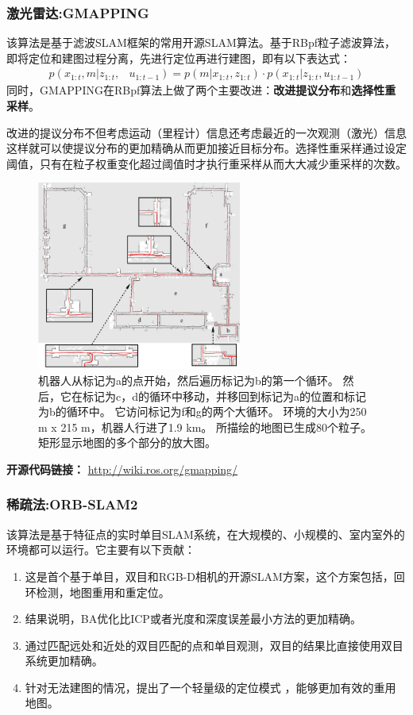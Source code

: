 \documentclass[cs4size,a4paper]{ctexart}
\numberwithin{equation}{section}
\numberwithin{table}{section}
\numberwithin{figure}{section}
\begin{document}
\subsubsection{激光雷达:GMAPPING}
该算法\cite{1570477}是基于滤波SLAM框架的常用开源SLAM算法。基于RBpf粒子滤波算法，即将定位和建图过程分离，先进行定位再进行建图，即有以下表达式：
\begin{align}
    p\left(x_{1: t}, m | z_{1: t},\right.&\left.u_{1: t-1}\right) =p\left(m | x_{1: t}, z_{1: t}\right) \cdot p\left(x_{1: t} | z_{1: t}, u_{1: t-1}\right)
\end{align}
同时，GMAPPING在RBpf算法上做了两个主要改进：\textbf{改进提议分布}和\textbf{选择性重采样}。

改进的提议分布不但考虑运动（里程计）信息还考虑最近的一次观测（激光）信息这样就可以使提议分布的更加精确从而更加接近目标分布。选择性重采样通过设定阈值，只有在粒子权重变化超过阈值时才执行重采样从而大大减少重采样的次数。

\begin{figure}[H]
  \centering
  \includegraphics[width=0.6\textwidth]{figure/gmapping-1.png}
  \caption{机器人从标记为a的点开始，然后遍历标记为b的第一个循环。 然后，它在标记为c，d的循环中移动，并移回到标记为a的位置和标记为b的循环中。 它访问标记为f和g的两个大循环。 环境的大小为250 m x 215 m，机器人行进了1.9 km。 所描绘的地图已生成80个粒子。 矩形显示地图的多个部分的放大图。}
\end{figure}

\textbf{开源代码链接：}
\url{http://wiki.ros.org/gmapping/}

\subsubsection{稀疏法:ORB-SLAM2}
该算法\cite{murORB2}是基于特征点的实时单目SLAM系统，在大规模的、小规模的、室内室外的环境都可以运行。它主要有以下贡献：
\begin{enumerate}[1)]
        \item 这是首个基于单目，双目和RGB-D相机的开源SLAM方案，这个方案包括，回环检测，地图重用和重定位。
        \item 结果说明，BA优化比ICP或者光度和深度误差最小方法的更加精确。
        \item 通过匹配远处和近处的双目匹配的点和单目观测，双目的结果比直接使用双目系统更加精确。
        \item 针对无法建图的情况，提出了一个轻量级的定位模式 ，能够更加有效的重用地图。
\end{enumerate}
\end{document}
